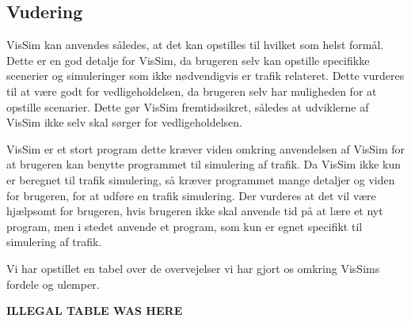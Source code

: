 
\subsection{Vudering}
VisSim kan anvendes således, at det kan opstilles til hvilket som helst formål. Dette er en god detalje for VisSim, da brugeren selv kan opstille specifikke scenerier og simuleringer som ikke nødvendigvis er trafik relateret. Dette vurderes til at være godt for vedligeholdelsen, da brugeren selv har muligheden for at opstille scenarier. Dette gør VisSim fremtidssikret, således at udviklerne af VisSim ikke selv skal sørger for vedligeholdelsen.

VisSim er et stort program dette kræver viden omkring anvendelsen af VisSim for at brugeren kan benytte programmet til simulering af trafik. Da VisSim ikke kun er beregnet til trafik simulering, så kræver programmet mange detaljer og viden for brugeren, for at udføre en trafik simulering. Der vurderes at det vil være hjælpsomt for brugeren, hvis brugeren ikke skal anvende tid på at lære et nyt program, men i stedet anvende et program, som kun er egnet specifikt til simulering af trafik. 

Vi har opstillet en tabel over de overvejelser vi har gjort os omkring VisSims fordele og ulemper.

\textbf{ILLEGAL TABLE WAS HERE}




